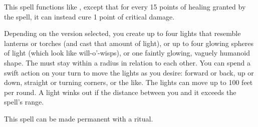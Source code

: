 \begin{spelleffect}
  This spell functions like , except that for every 15 points of healing granted by the spell, it can instead cure 1 point of critical damage.
\end{spelleffect}

\begin{comment}
\subsubsection{D}
\end{comment}

\spellrng{\rngmed}
\begin{spelleffect}
  Depending on the version selected, you create up to four lights that resemble lanterns or torches (and cast that amount of light), or up to four glowing spheres of light (which look like will-o'-wisps), or one faintly glowing, vaguely humanoid shape. The  must stay within a \areasmall radius in relation to each other. You can spend a swift action on your turn to move the lights as you desire: forward or back, up or down, straight or turning corners, or the like. The lights can move up to 100 feet per round. A light winks out if the distance between you and it exceeds the spell's range.
\end{spelleffect}
\begin{spellnotes}
This spell can be made permanent with a  ritual.
\end{spellnotes}

